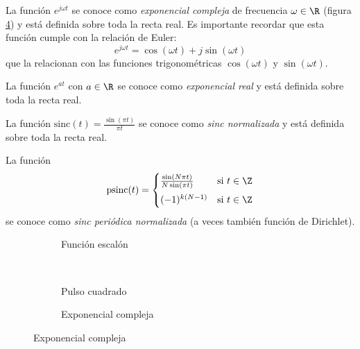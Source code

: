 \begin{example}
    La función $e^{j \omega t}$ se conoce como \emph{exponencial compleja} de frecuencia $\omega \in \R$ (figura \ref{fig:complex_expontential}) y está definida sobre toda la recta real. Es importante recordar que esta función cumple con la relación de Euler:
    \begin{equation*}
        e^{j \omega t} = \cos(\omega t) + j \sin(\omega t)
    \end{equation*}
    que la relacionan con las funciones trigonométricas $\cos(\omega t)$ y $\sin(\omega t)$.
\end{example}

\begin{example}
    La función $e^{at}$ con $a\in \R$ se conoce como \emph{exponencial real} y está definida sobre toda la recta real.
\end{example}

\begin{example}
    La función $\mathrm{sinc}(t) = \frac{\sin(\pi t)}{\pi t}$ se conoce como \emph{sinc normalizada} y está definida sobre toda la recta real.
\end{example}

\begin{example}
    La función 
    \begin{equation*}
        \mathrm{psinc}(t) = \begin{cases}
            \frac{\sin(N \pi t)}{N \sin(\pi t)} & \mbox{si } t \in \Z \\[0.5em]
            (-1)^{k(N-1)} & \mbox{si } t \in \Z
        \end{cases}
    \end{equation*}
    se conoce como \emph{sinc periódica normalizada} (a veces también función de Dirichlet).
    
\end{example}

\begin{figure}[h]
    \centering
    \begin{subfigure}[b]{0.4\textwidth}
        \centering
        
        \caption{Función escalón}
        \label{fig:step_function}
    \end{subfigure}
    ~
    \begin{subfigure}[b]{0.4\textwidth}
        \centering
        
        \caption{Pulso cuadrado}
        \label{fig:square_pulse}
    \end{subfigure}
    \vspace*{2em}

    \begin{subfigure}[b]{.9\textwidth}
        \centering
        
        \caption{Exponencial compleja}
        \label{fig:complex_expontential}
    \end{subfigure}
\end{figure}

